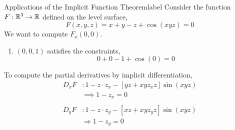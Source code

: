 \begin{ex}{Applications of the Implicit Function Theorem}{label}
	Consider the function $F: \mathbb{R}^3 \rightarrow \mathbb{R}$ defined on the level surface,
	\[F(x, y, z)=x+y-z+\cos (x y z) = 0\]
	We want to compute $F_x(0,0)$.
	\begin{enumerate}
		\item $(0, 0, 1)$ satisfies the constraints,
		\[0+0-1+\cos (0)=0\]
	\end{enumerate}
	To compute the partial derivatives by implicit differentiation,
	\begin{align*}
	D_x F &: 1-z \cdot z_x-\left[y z+x y z_x z\right] \sin (x y z) \\
	& \implies 1-z_x=0 \\ \\ 
	D_y F &: 1-z \cdot z_y-\left[x z+x y z_y z\right] \sin (x y z) \\
	& \Rightarrow 1-z_y=0
	\end{align*}
\end{ex}